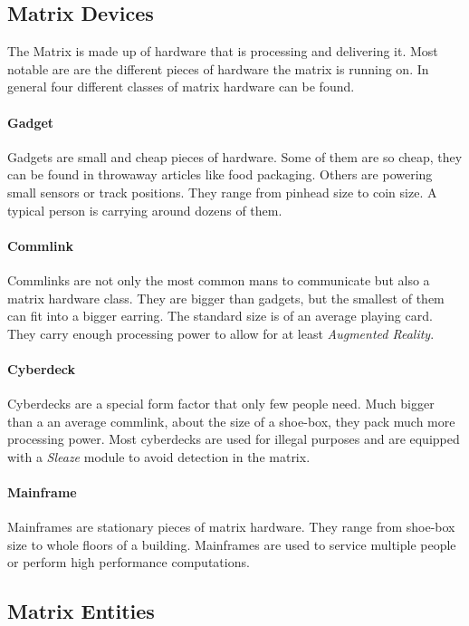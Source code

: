 \subsection{Matrix Devices}

The Matrix is made up of hardware that is processing and delivering it. Most notable are are
the different pieces of hardware the matrix is running on. In general four different classes of
matrix hardware can be found.

\paragraph{Gadget}
Gadgets are small and cheap pieces of hardware. Some of them are so cheap, they can be found in
throwaway articles like food packaging. Others are powering small sensors or track positions. They
range from pinhead size to coin size.
A typical person is carrying around dozens of them.

\paragraph{Commlink}
Commlinks are not only the most common mans to communicate but also a matrix hardware class.
They are bigger than gadgets, but the smallest of them can fit into a bigger earring. The
standard size is of an average playing card. They carry enough processing power to allow for at
least \emph{Augmented Reality}.

\paragraph{Cyberdeck}
Cyberdecks are a special form factor that only few people need. Much bigger than a an average
commlink, about the size of a shoe-box, they pack much more processing power. Most cyberdecks are
used for illegal purposes and are equipped with a \emph{Sleaze} module to avoid detection in the
matrix.

\paragraph{Mainframe}
Mainframes are stationary pieces of matrix hardware. They range from shoe-box size to whole floors
of a building. Mainframes are used to service multiple people or perform high performance
computations.


\subsection{Matrix Entities}

